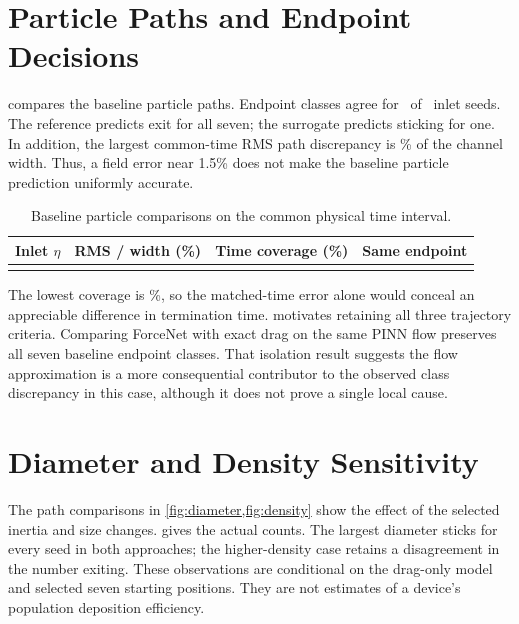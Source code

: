 \section{Particle Paths and Endpoint Decisions}
 compares the baseline particle paths. Endpoint classes
agree for \BaselineAgreement\ of \BaselineCount\ inlet seeds. The
reference predicts exit for all seven; the surrogate predicts sticking for
one. In addition, the largest common-time RMS path discrepancy is
\MaxPathWidthPercent\% of the channel width. Thus, a field error near
1.5\% does not make the baseline particle prediction uniformly accurate.


\begin{table}[!htbp]
\centering\small
\caption{Baseline particle comparisons on the common physical time interval.}
\label{tab:paths}
\begin{tabularx}{\textwidth}{@{}rYYY@{}}
\toprule Inlet $\eta$ & RMS / width (\%) & Time coverage (\%) & Same endpoint\\\midrule
{}
\bottomrule
\end{tabularx}
\end{table}
The lowest coverage is \MinimumTimeCoveragePercent\%, so the matched-time
error alone would conceal an appreciable difference in termination time.
 motivates retaining all three trajectory criteria.
Comparing ForceNet with exact drag on the same PINN flow preserves all seven
baseline endpoint classes. That isolation result suggests the flow
approximation is a more consequential contributor to the observed class
discrepancy in this case, although it does not prove a single local cause.

\section{Diameter and Density Sensitivity}
The path comparisons in \cref{fig:diameter,fig:density} show the effect of the
selected inertia and size changes.  gives the actual
counts. The largest diameter sticks for every seed in both approaches;
the higher-density case retains a disagreement in the number exiting.
These observations are conditional on the drag-only model and selected
seven starting positions. They are not estimates of a device's population
deposition efficiency.


